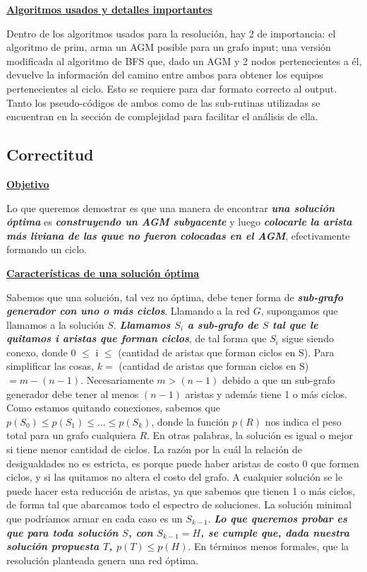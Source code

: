 \documentclass[10pt,a4paper]{article}
\begin{document}
\noindent \textbf{\underline{Algoritmos usados y detalles importantes}}

Dentro de los algoritmos usados para la resolución, hay 2 de importancia: el algoritmo de prim, arma un AGM posible para un grafo input; una versión modificada al algoritmo de BFS que, dado un AGM y 2 nodos pertenecientes a él, devuelve la información del camino entre ambos para obtener los equipos pertenecientes al ciclo. Esto se requiere para dar formato correcto al output. Tanto los pseudo-códigos de ambos como de las sub-rutinas utilizadas se encuentran en la sección de complejidad para facilitar el análisis de ella.

\newpage
\subsection{Correctitud}

\noindent\textbf{\underline{Objetivo}}

Lo que queremos demostrar es que una manera de encontrar \textbf{\textit{una solución óptima}} es \textbf{\textit{construyendo un AGM subyacente}} y luego \textbf{\textit{colocarle la arista más liviana de las quue no fueron colocadas en el AGM}}, efectivamente formando un ciclo.

\noindent\textbf{\underline{Características de una solución óptima}}

Sabemos que una solución, tal vez no óptima, debe tener forma de \textbf{\textit{sub-grafo generador con uno o más ciclos}}. Llamando a la red $G$, supongamos que llamamos a la solución $S$. \textbf{\textit{Llamamos \boldmath$S_{i}$ a sub-grafo de $S$ tal que le quitamos i aristas que forman ciclos}}, de tal forma que $S_{i}$ sigue siendo conexo, donde 0 $\leq$ i $\leq$ (cantidad de aristas que forman ciclos en S). Para simplificar las cosas, $k =$ (cantidad de aristas que forman ciclos en S) $= m - (n-1)$. Necesariamente $m > (n-1)$ debido a que un sub-grafo generador debe tener al menos $(n-1)$ aristas y además tiene 1 o más ciclos. Como estamos quitando conexiones, sabemos que $p(S_{0})\leq p(S_{1}) \leq ... \leq p(S_{k})$, donde la función $p(R)$ nos indica el peso total para un grafo cualquiera $R$. En otras palabras, la solución es igual o mejor si tiene menor cantidad de ciclos. La razón por la cuál la relación de desigualdades no es estricta, es porque puede haber aristas de costo $0$ que formen ciclos, y si las quitamos no altera el costo del grafo. A cualquier solución se le puede hacer esta reducción de aristas, ya que sabemos que tienen 1 o más ciclos, de forma tal que abarcamos todo el espectro de soluciones. La solución minimal que podríamos armar en cada caso es un $S_{k-1}$. \textbf{\textit{Lo que queremos probar es que para toda solución \boldmath$S$, con \boldmath$S_{k-1} = H$, se cumple que, dada nuestra solución propuesta \boldmath$T$, \boldmath$p(T) \leq p(H)$}}. En términos menos formales, que la resolución planteada genera una red óptima.
\end{document}
